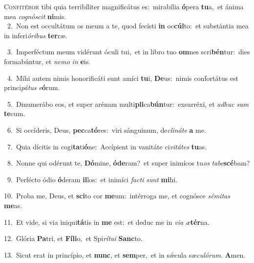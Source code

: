 \lettrine{\initial\textcolor{\initialcolor}{C}}{onfitébor} tibi quia terribíliter magnificátus es:~\dagger mirabília \textbf{ó}\-pera \textbf{tu}\-a,~\star et ánima mea \textit{co}\-\textit{gnó}\textit{scit} \textbf{ni}\-mis.\\
{\numbfont\textcolor{\numbcolor}{~2.}}~Non est occultátum os meum a te, quod fecísti \textbf{in} oc\-\textbf{cúl}\-to:~\star et substántia mea in inferi\-\textit{ó}\-\textit{ri}\textit{bus} \textbf{ter}\-ræ.\par
{\numbfont\textcolor{\numbcolor}{~3.}}~Imperféctum meum vidérunt óculi tui,~\dagger et in libro tuo \textbf{om}\-nes scri\-\textbf{bén}\-tur:~\star dies formabúntur, et \textit{ne}\-\textit{mo} \textit{in} \textbf{e}\-is.\par
{\numbfont\textcolor{\numbcolor}{~4.}}~Mihi autem nimis honorificáti sunt amíci \textbf{tu}\-i, \textbf{De}\-us:~\star nimis confortátus est princi\-\textit{pá}\-\textit{tus} \textit{e}\-\textbf{ó}rum.\par
{\numbfont\textcolor{\numbcolor}{~5.}}~Dinumerábo eos, et super arénam multi\-\textbf{pli}\-ca\-\textbf{bún}\-tur:~\star exsurréxi, et \textit{ad}\-\textit{huc} \textit{sum} \textbf{te}\-cum.\par
{\numbfont\textcolor{\numbcolor}{~6.}}~Si occíderis, Deus, \textbf{pec}\-ca\-\textbf{tó}\-res:~\star viri sánguinum, de\-\textit{cli}\-\textit{ná}\textit{te} \textbf{a} me.\par
{\numbfont\textcolor{\numbcolor}{~7.}}~Quia dícitis in cogi\-\textbf{ta}\-ti\-\textbf{ó}\-ne:~\star Accípient in vanitáte ci\-\textit{vi}\-\textit{tá}\textit{tes} \textbf{tu}\-as.\par
{\numbfont\textcolor{\numbcolor}{~8.}}~Nonne qui odérunt te, \textbf{Dó}\-mine, \textbf{ó}\-\textbf{de}ram?~\star et super inimícos tu\textit{os} \textit{ta}\-\textit{be}\textbf{scé}bam?\par
{\numbfont\textcolor{\numbcolor}{~9.}}~Perfécto ódio \textbf{ó}\-deram \textbf{il}\-los:~\star et inimíci \textit{fac}\-\textit{ti} \textit{sunt} \textbf{mi}\-hi.\par
{\numbfont\textcolor{\numbcolor}{10.}}~Proba me, Deus, et \textbf{sci}\-to cor \textbf{me}\-um:~\star intérroga me, et cognósce \textit{sé}\-\textit{mi}\textit{tas} \textbf{me}\-as.\par
{\numbfont\textcolor{\numbcolor}{11.}}~Et vide, si via iniqui\-\textbf{tá}\-tis in \textbf{me} est:~\star et deduc me in \textit{vi}\-\textit{a} \textit{æ}\-\textbf{tér}na.\par
{\numbfont\textcolor{\numbcolor}{12.}}~Glória \textbf{Pa}\-tri, et \textbf{Fí}\-\textbf{li}o,~\star et Spi\-\textit{rí}\-\textit{tu}\textit{i} \textbf{Sanc}\-to.\par
{\numbfont\textcolor{\numbcolor}{13.}}~Sicut erat in princípio, et \textbf{nunc}\-, et \textbf{sem}\-per,~\star et in sǽcula sæ\-\textit{cu}\-\textit{ló}\textit{rum}. \textbf{A}\-men.\par
